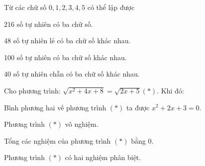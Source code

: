 
\NQuestion Từ các chữ số $0,1,2,3,4,5$ có thể lập được

\begin{SubQuestions}
\item 216 số tự nhiên có ba chữ số.
\item 48 số tự nhiên lẻ có ba chữ số khác nhau.
\item 100 số tự nhiên có ba chữ số khác nhau.
\item 40 số tự nhiên chẵn có ba chữ số khác nhau.
\end{SubQuestions}

\NQuestion Cho phương trình: $\sqrt{x^2+4x+8}=\sqrt{2x+5}\left(*\right)$. Khi đó:
\begin{SubQuestions}
\item Bình phương hai vế phương trình $(*)$ ta được $x^2+2x+3=0$.
\item Phương trình $(*)$ vô nghiệm.
\item Tổng các nghiệm của phương trình $(*)$ bằng $0$.
\item Phương trình $(*)$ có hai nghiệm phân biệt.
\end{SubQuestions}
